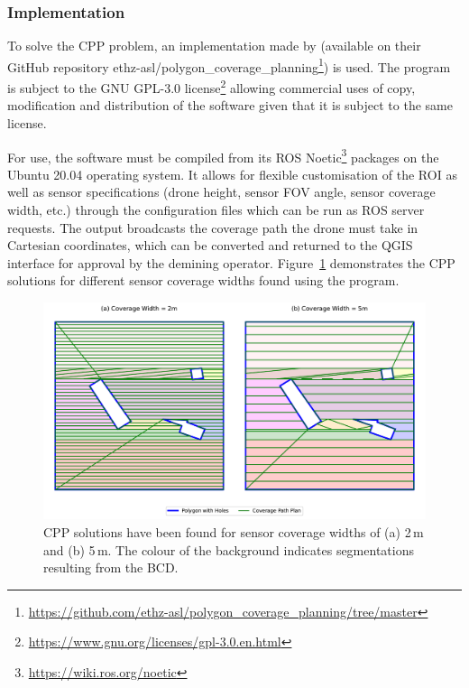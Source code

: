 \subsubsection{Implementation}

To solve the \gls{CPP} problem, an implementation made by \cite{bahnemann2021cpp} (available on their GitHub repository ethz-asl/polygon\_coverage\_planning\footnote{\url{https://github.com/ethz-asl/polygon_coverage_planning/tree/master}}) is used. The program is subject to the GNU GPL-3.0 license\footnote{\url{https://www.gnu.org/licenses/gpl-3.0.en.html}} allowing commercial uses of copy, modification and distribution of the software given that it is subject to the same license. 

For use, the software must be compiled from its ROS Noetic\footnote{\url{https://wiki.ros.org/noetic}} packages on the Ubuntu 20.04 operating system. It allows for flexible customisation of the \gls{ROI} as well as sensor specifications (drone height, sensor FOV angle, sensor coverage width, etc.) through the configuration files which can be run as ROS server requests. The output broadcasts the coverage path the drone must take in Cartesian coordinates, which can be converted and returned to the \gls{QGIS} interface for approval by the demining operator. Figure~\ref{fig:msp_bahnemann} demonstrates the \gls{CPP} solutions for different sensor coverage widths found using the program. 

\begin{figure}[h!]
    \centering
    \includegraphics[width=\linewidth]{figs/Jihwan/CPP_diff_widths.pdf}
    \caption[CPP Solution Examples]
    {\gls{CPP} solutions have been found for sensor coverage widths of (a) 2\,m and (b) 5\,m. The colour of the background indicates segmentations resulting from the \gls{BCD}.}
    \label{fig:msp_bahnemann}
\end{figure}

